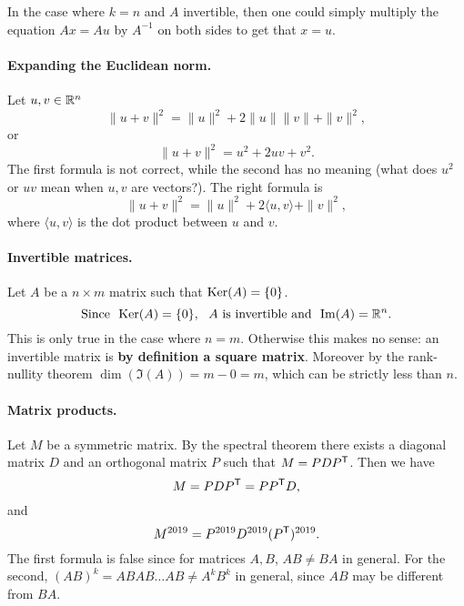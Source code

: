 \documentclass[11pt,nocut]{article}
\begin{document}
In the case where $k=n$ and $A$ invertible, then one could simply multiply the equation $Ax = Au$ by $A^{-1}$ on both sides to get that $x=u$.

\paragraph{Expanding the Euclidean norm.}
Let $u,v \in \mathbb{R}^n$
{\color{red}
	$$
	\|u+v\|^2 = \|u\|^2 + 2 \|u\| \|v\| + \|v\|^2,
	$$
	or
	$$
	\|u+v\|^2 = u^2 + 2 u v + v^2.
	$$
}
The first formula is not correct, while the second has no meaning (what does $u^2$ or $uv$ mean when $u,v$ are vectors?). The right formula is
$$
\|u+v\|^2 = \|u\|^2 + 2 \langle u , v\rangle + \|v\|^2,
$$
where $\langle u,v \rangle$ is the dot product between $u$ and $v$.

\paragraph{Invertible matrices.} Let $A$ be a $n \times m$ matrix such that ${{\rm Ker}}(A) = \{0\}$.
{\color{red}
	$$
	\text{Since} \ \ \Ker(A) = \{0\}, \ \ A \ \text{is invertible and} \ \ \Im(A) = \R^n. 
	$$
}
This is only true in the case where $n=m$. Otherwise this makes no sense: an invertible matrix is \textbf{by definition a square matrix}. Moreover by the rank-nullity theorem $\dim (\Im(A)) = m - 0 = m$, which can be strictly less than $n$.

\paragraph{Matrix products.} Let $M$ be a symmetric matrix. By the spectral theorem there exists a diagonal matrix $D$ and an orthogonal matrix $P$ such that $M = P D P^{{\sf T}}$. Then we have
{\color{red}
	$$
	M = P D P^{{\sf T}} = P P^{{\sf T}} D,
	$$
	and
	$$
	M^{2019} = P^{2019} D^{2019} (P^{{\sf T}})^{2019}.
	$$
}
The first formula is false since for matrices $A,B$, $AB\neq BA$ in general. For the second, $(AB)^k = ABAB \dots AB \neq A^k B^k$ in general, since $AB$ may be different from $BA$.





\vspace{1cm}
\centerline{}

%
%
\end{document}

